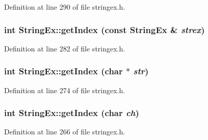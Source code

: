 Definition at line 290 of file stringex.h.\hypertarget{classStringEx_706fdc80a0b878a9e273b22db649498e}{
\subsubsection[{getIndex}]{\setlength{\rightskip}{0pt plus 5cm}int StringEx::getIndex (const {\bf StringEx} \& {\em strex})}}
\label{classStringEx_706fdc80a0b878a9e273b22db649498e}




Definition at line 282 of file stringex.h.\hypertarget{classStringEx_b1238754fc86c1cb1103202bebb1d62b}{
\subsubsection[{getIndex}]{\setlength{\rightskip}{0pt plus 5cm}int StringEx::getIndex (char $\ast$ {\em str})}}
\label{classStringEx_b1238754fc86c1cb1103202bebb1d62b}




Definition at line 274 of file stringex.h.\hypertarget{classStringEx_a948cbadc89b04c5a794efa85409b6c8}{
\subsubsection[{getIndex}]{\setlength{\rightskip}{0pt plus 5cm}int StringEx::getIndex (char {\em ch})}}
\label{classStringEx_a948cbadc89b04c5a794efa85409b6c8}




Definition at line 266 of file stringex.h.

